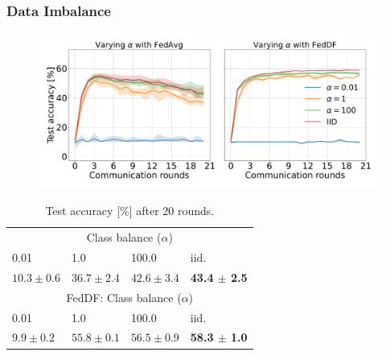 \documentclass{beamer}
\begin{document}
\begin{frame}
    \frametitle{Data Imbalance}
    \begin{figure}[H]
        \centering
	\includegraphics[width=.7\linewidth]{imgs/feddf-alpha.pdf}
    \end{figure}\noindent

\begin{table}[htb!]
    \centering
    \footnotesize
    \begin{tabular}{llll}
       \hline
        \multicolumn{4}{c}{Class balance ($\alpha$)}\\
        0.01 & 1.0 & 100.0 & iid. \\
       \hline
        $10.3 \pm 0.6$ & $36.7 \pm 2.4$ & $42.6 \pm 3.4$ & \textbf{ 43.4 $\pm$ 2.5  }\\
        \multicolumn{4}{c}{FedDF: Class balance ($\alpha$)}\\
        0.01 & 1.0 & 100.0 & iid. \\
       \hline
        $9.9 \pm 0.2$ & $55.8 \pm 0.1$ & $56.5 \pm 0.9$ & \textbf{ 58.3 $\pm$ 1.0 } \\
\end{tabular}
    \caption{
	Test accuracy [\%] after 20 rounds.
    }
\end{table}
\end{frame}
\end{document}
